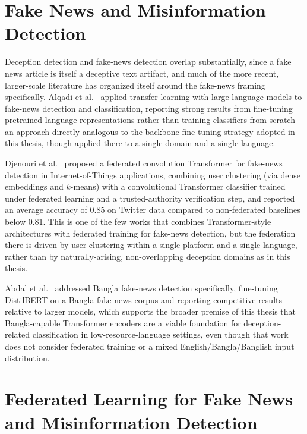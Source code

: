 \section{Fake News and Misinformation Detection}

Deception detection and fake-news detection overlap substantially, since a fake news article is itself a deceptive text artifact, and much of the more recent, larger-scale literature has organized itself around the fake-news framing specifically. Alqadi et al.\ \cite{alqadi2025transfer} applied transfer learning with large language models to fake-news detection and classification, reporting strong results from fine-tuning pretrained language representations rather than training classifiers from scratch -- an approach directly analogous to the backbone fine-tuning strategy adopted in this thesis, though applied there to a single domain and a single language.

Djenouri et al.\ \cite{djenouri2024federated} proposed a federated convolution Transformer for fake-news detection in Internet-of-Things applications, combining user clustering (via dense embeddings and $k$-means) with a convolutional Transformer classifier trained under federated learning and a trusted-authority verification step, and reported an average accuracy of 0.85 on Twitter data compared to non-federated baselines below 0.81. This is one of the few works that combines Transformer-style architectures with federated training for fake-news detection, but the federation there is driven by user clustering within a single platform and a single language, rather than by naturally-arising, non-overlapping deception domains as in this thesis.

Abdal et al.\ \cite{abdal2023transformer} addressed Bangla fake-news detection specifically, fine-tuning DistilBERT on a Bangla fake-news corpus and reporting competitive results relative to larger models, which supports the broader premise of this thesis that Bangla-capable Transformer encoders are a viable foundation for deception-related classification in low-resource-language settings, even though that work does not consider federated training or a mixed English/Bangla/Banglish input distribution.

\section{Federated Learning for Fake News and Misinformation Detection}

